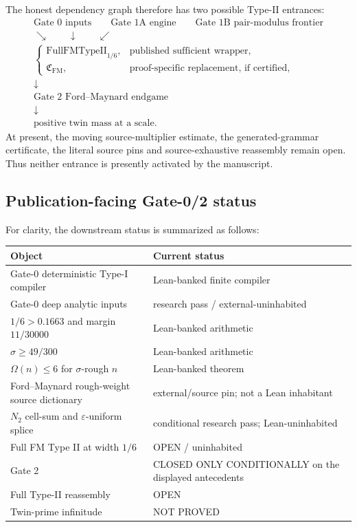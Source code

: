 \documentclass[11pt]{article}
\theoremstyle{definition}
\newcommand{\1}{\mathbf 1}
\begin{document}
The honest dependency graph therefore has two possible Type-II entrances:
\[
\begin{gathered}
 \text{Gate 0 inputs}\qquad
 \text{Gate 1A engine}\qquad
 \text{Gate 1B pair-modulus frontier}\\
 \searrow\qquad\downarrow\qquad\swarrow\\[-1mm]
 \begin{cases}
  \mathrm{FullFMTypeII}_{1/6}, & \text{published sufficient wrapper},\\
  \mathfrak C_{\mathrm{FM}}, & \text{proof-specific replacement, if certified},
 \end{cases}\\
 \downarrow\\[-1mm]
 \text{Gate 2 Ford--Maynard endgame}\\
 \downarrow\\[-1mm]
 \text{positive twin mass at a scale}.
\end{gathered}
\]
At present, the moving source-multiplier estimate, the generated-grammar
certificate, the literal source pins and source-exhaustive reassembly remain
open.  Thus neither entrance is presently activated by the manuscript.

\subsection{Publication-facing Gate-0/2 status}
For clarity, the downstream status is summarized as follows:
\begin{center}
\begin{tabular}{p{}p{}}
\toprule
Object & Current status\\
\midrule
Gate-0 deterministic Type-I compiler & Lean-banked finite compiler\\
Gate-0 deep analytic inputs & research pass / external-uninhabited\\
$1/6>0.1663$ and margin $11/30000$ & Lean-banked arithmetic\\
$\sigma\ge49/300$ & Lean-banked arithmetic\\
$\Omega(n)\le6$ for $\sigma$-rough $n$ & Lean-banked theorem\\
Ford--Maynard rough-weight source dictionary & external/source pin; not a Lean inhabitant\\
$N_2$ cell-sum and $\varepsilon$-uniform splice & conditional research pass; Lean-uninhabited\\
Full FM Type II at width $1/6$ & OPEN / uninhabited\\
Gate 2 & CLOSED ONLY CONDITIONALLY on the displayed antecedents\\
Full Type-II reassembly & OPEN\\
Twin-prime infinitude & NOT PROVED\\
\bottomrule
\end{tabular}
\end{center}
\end{document}
